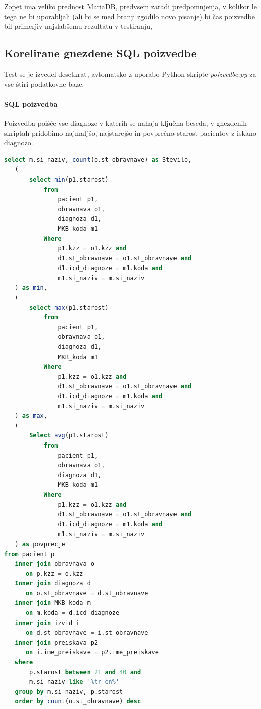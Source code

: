 \documentclass[a4paper,11pt]{report}
\begin{document}
Zopet ima veliko prednost MariaDB, predvsem zaradi predpomnjenja, v kolikor le tega ne bi uporabljali (ali bi se med branji zgodilo novo pisanje) bi čas poizvedbe bil primerjiv najslabšemu rezultatu v testiranju,

\pagebreak
\subsection{Korelirane gnezdene SQL poizvedbe}
Test se je izvedel desetkrat, avtomatsko z uporabo Python skripte \textit{poizvedbe.py} za vse štiri podatkovne baze.

\paragraph{SQL poizvedba}
Poizvedba poišče vse diagnoze v katerih se nahaja ključna beseda, v gnezdenih skriptah pridobimo
najmaljšo, najstarejšo in povprečno starost pacientov z iskano diagnozo.

\begin{lstlisting}[language = SQL]
   select m.si_naziv, count(o.st_obravnave) as Stevilo,
   (
       select min(p1.starost)
           from
               pacient p1,
               obravnava o1,
               diagnoza d1,
               MKB_koda m1
           Where
               p1.kzz = o1.kzz and
               d1.st_obravnave = o1.st_obravnave and
               d1.icd_diagnoze = m1.koda and
               m1.si_naziv = m.si_naziv
   ) as min,
   (
       select max(p1.starost)
           from
               pacient p1,
               obravnava o1,
               diagnoza d1,
               MKB_koda m1
           Where
               p1.kzz = o1.kzz and
               d1.st_obravnave = o1.st_obravnave and
               d1.icd_diagnoze = m1.koda and
               m1.si_naziv = m.si_naziv
   ) as max,
   (
       Select avg(p1.starost)
           from
               pacient p1,
               obravnava o1,
               diagnoza d1,
               MKB_koda m1
           Where
               p1.kzz = o1.kzz and
               d1.st_obravnave = o1.st_obravnave and
               d1.icd_diagnoze = m1.koda and
               m1.si_naziv = m.si_naziv
   ) as povprecje
from pacient p
   inner join obravnava o 
      on p.kzz = o.kzz
   Inner join diagnoza d 
      on o.st_obravnave = d.st_obravnave
   inner join MKB_koda m 
      on m.koda = d.icd_diagnoze
   inner join izvid i 
      on d.st_obravnave = i.st_obravnave
   inner join preiskava p2 
      on i.ime_preiskave = p2.ime_preiskave
   where
       p.starost between 21 and 40 and
       m.si_naziv like '%tr_en%'
   group by m.si_naziv, p.starost
   order by count(o.st_obravnave) desc
\end{lstlisting}
\end{document}
